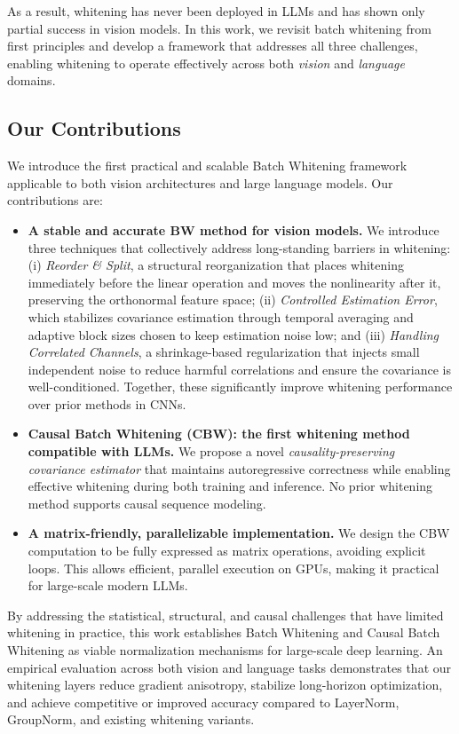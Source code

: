 As a result, whitening has never been deployed in LLMs and has shown only partial success in vision models. 
In this work, we revisit batch whitening from first principles and develop a framework 
that addresses all three challenges, enabling whitening to operate effectively across both 
\emph{vision} and \emph{language} domains.

\subsection*{Our Contributions}

We introduce the first practical and scalable Batch Whitening framework applicable to both vision architectures 
and large language models. Our contributions are:

\begin{itemize}
    \item \textbf{A stable and accurate BW method for vision models.}
    We introduce three techniques that collectively address long-standing barriers in whitening:
    (i) \emph{Reorder \& Split}, a structural reorganization that places whitening immediately before the linear operation and moves the nonlinearity after it, preserving the orthonormal feature space;
    (ii) \emph{Controlled Estimation Error}, which stabilizes covariance estimation through temporal averaging and adaptive block sizes chosen to keep estimation noise low; and
    (iii) \emph{Handling Correlated Channels}, a shrinkage-based regularization that injects small independent noise to reduce harmful correlations and ensure the covariance is well-conditioned.
    Together, these significantly improve whitening performance over prior methods in CNNs.


    \item \textbf{Causal Batch Whitening (CBW): the first whitening method compatible with LLMs.} 
    We propose a novel \emph{causality-preserving covariance estimator} that maintains autoregressive correctness 
    while enabling effective whitening during both training and inference. 
    No prior whitening method supports causal sequence modeling.

    \item \textbf{A matrix-friendly, parallelizable implementation.} 
    We design the CBW computation to be fully expressed as matrix operations, avoiding explicit loops. 
    This allows efficient, parallel execution on GPUs, making it practical for large-scale modern LLMs.

\end{itemize}

By addressing the statistical, structural, and causal challenges that have limited whitening in practice, 
this work establishes Batch Whitening and Causal Batch Whitening as viable normalization mechanisms 
for large-scale deep learning.
An empirical evaluation across both vision and language tasks demonstrates that our whitening layers reduce gradient anisotropy, 
stabilize long-horizon optimization, and achieve competitive or improved accuracy compared to LayerNorm, GroupNorm, and existing whitening variants.
